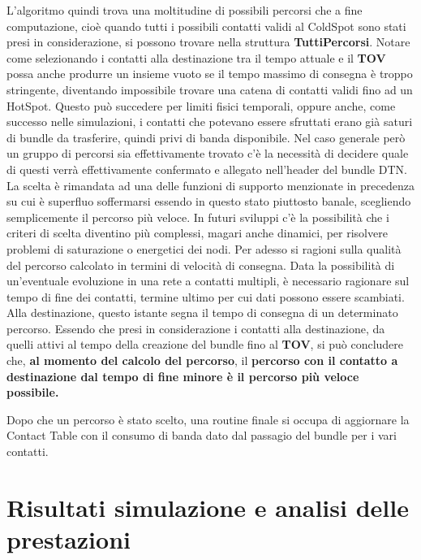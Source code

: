 \documentclass[12pt,a4paper,oneside]{book}
\begin{document}
		L'algoritmo quindi trova una moltitudine di possibili percorsi che a fine computazione, cioè quando tutti i possibili contatti validi al ColdSpot sono stati presi in considerazione, si possono trovare nella struttura {\bf TuttiPercorsi}. Notare come selezionando i contatti alla destinazione tra il tempo attuale e il {\bf TOV} possa anche produrre un insieme vuoto se il tempo massimo di consegna è troppo stringente, diventando impossibile trovare una catena di contatti validi fino ad un HotSpot. Questo può succedere per limiti fisici temporali, oppure anche, come successo nelle simulazioni, i contatti che potevano essere sfruttati erano già saturi di bundle da trasferire, quindi privi di banda disponibile. Nel caso generale però un gruppo di percorsi sia effettivamente trovato c'è la necessità di decidere quale di questi verrà effettivamente confermato e allegato nell'header del bundle DTN. La scelta è rimandata ad una delle funzioni di supporto menzionate in precedenza su cui è superfluo soffermarsi essendo in questo stato piuttosto banale, scegliendo semplicemente il percorso più veloce. In futuri sviluppi c'è la possibilità che i criteri di scelta diventino più complessi, magari anche dinamici, per risolvere problemi di saturazione o energetici dei nodi. Per adesso si ragioni sulla qualità del percorso calcolato in termini di velocità di consegna. Data la possibilità di un'eventuale evoluzione in una rete a contatti multipli, è necessario ragionare sul tempo di fine dei contatti, termine ultimo per cui dati possono essere scambiati. Alla destinazione, questo istante segna il tempo di consegna di un determinato percorso. Essendo che presi in considerazione i contatti alla destinazione, da quelli attivi al tempo della creazione del bundle fino al {\bf TOV}, si può concludere che, {\bf al momento del calcolo del percorso}, il {\bf percorso con il contatto a destinazione dal tempo di fine minore è il percorso più veloce possibile.}
		
		Dopo che un percorso è stato scelto, una routine finale si occupa di aggiornare la Contact Table con il consumo di banda dato dal passagio del bundle per i vari contatti.

		
	\chapter{Risultati simulazione e analisi delle prestazioni}
		
\end{document}
